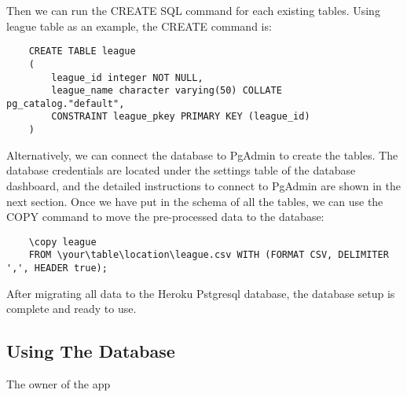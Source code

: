 Then we can run the CREATE SQL command for each existing tables. Using league table as an example, the CREATE command is:
\begin{verbatim}
    CREATE TABLE league
    (
        league_id integer NOT NULL,
        league_name character varying(50) COLLATE pg_catalog."default",
        CONSTRAINT league_pkey PRIMARY KEY (league_id)
    )
\end{verbatim}
Alternatively, we can connect the database to PgAdmin to create the tables. The database credentials are located under the settings table of the database dashboard, and the detailed instructions to connect to PgAdmin are shown in the next section. 
Once we have put in the schema of all the tables, we can use the COPY command to move the pre-processed data to the database:
\begin{verbatim}
    \copy league 
    FROM \your\table\location\league.csv WITH (FORMAT CSV, DELIMITER ',', HEADER true);
\end{verbatim}
After migrating all data to the Heroku Pstgresql database, the database setup is complete and ready to use.
\subsection{Using The Database}
The owner of the app 
